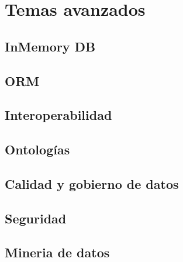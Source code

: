 \chapter{Temas avanzados}

\section{InMemory DB}

\section{ORM}

\section{Interoperabilidad}

\section{Ontologías}

\section{Calidad y gobierno de datos}

\section{Seguridad}

\section{Mineria de datos}
